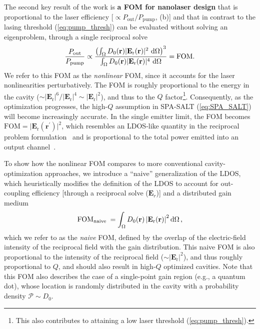 The second key result of the work is \textbf{a FOM for nanolaser design} that is proportional to the laser efficiency [$\propto P_\text{out}/P_\text{pump}$,  (b)] and that in contrast to the lasing threshold (\eqref{eq:pump_thresh}) can be evaluated without solving an eigenproblem, through a single reciprocal solve~\cite{ownpub4}
\begin{equation}\label{eq:eff_nl}
    \frac{P_\text{out}}{P_\text{pump}} \propto \frac{\left( \int_{\Omega} D_0(\mathbf{r})|\mathbf{E}_{\text{r}}(\mathbf{r})|^2 \,  \mathop{}\!\text{d} \Omega \right)^3} {\int_{\Omega} D_0(\mathbf{r}) |\mathbf{E}_{\text{r}}(\mathbf{r})|^4 \,  \mathop{}\!\text{d} \Omega} = \text{FOM}.
\end{equation}
We refer to this FOM as the \emph{nonlinear} FOM, since it accounts for the laser nonlinearities perturbatively. The FOM is roughly proportional 
to the energy in the cavity ($\sim |\mathbf{E}_{\text{r}}|^6 / |\mathbf{E}_{\text{r}}|^4 \sim |\mathbf{E}_{\text{r}}|^2$), and thus to the $Q$ factor\footnote{This also contributes to attaining a low
laser threshold (\eqref{eq:pump_thresh}).}. Consequently, as the optimization progresses, the high-$Q$ assumption in SPA-SALT (\eqref{eq:SPA_SALT}) will become increasingly accurate. In the single emitter limit, the FOM becomes
$\text{FOM}=\vert \mathbf{E}_\text{r}(\mathbf{r}^\prime) \vert^2$, which resembles an LDOS-like quantity in the reciprocal problem formulation~\cite{reci} and is proportional to the total power emitted into an output channel~\cite[App.~C]{reci}. 

To show how the nonlinear FOM compares to more conventional cavity-optimization approaches, we introduce a “naive” generalization of the LDOS, which heuristically modifies the definition
of the LDOS to account for out-coupling efficiency [through a reciprocal solve ($\mathbf{E}_r$)] and a distributed gain
medium
\begin{equation}\label{eq:SEL}
 \text{FOM}_{\text {naive }}=\int_{\Omega} D_0(\mathbf{r})\left|\mathbf{E}_{\text{r}}(\mathbf{r})\right|^2 \mathop{}\!\text{d} \Omega\,,
\end{equation}
which we refer to as the \emph{naive} FOM, defined by the overlap of the electric-field intensity of the reciprocal field with the gain distribution.
This naive FOM is also proportional to the intensity of the reciprocal field ($\sim |\mathbf{E}_{\text{r}}|^2$), and thus roughly proportional to $Q$, and should also result in 
high-$Q$ optimized cavities. Note that this FOM also describes the case of a single-point gain region (e.g., a quantum dot),
whose location is randomly distributed in the cavity with a probability density $\mathcal{P} \sim D_0$. 

